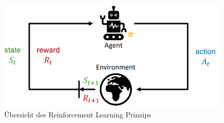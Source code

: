 \begin{figure} [h]
\begin{minipage}[t]{1\textwidth}
\vspace{0pt}
\includegraphics[width=\textwidth]{images/RL_Grundlagen}
 \caption{Übersicht des Reinforcement Learning Prinzips}
\label{RL_Grund}
\end{minipage}
\end{figure}


